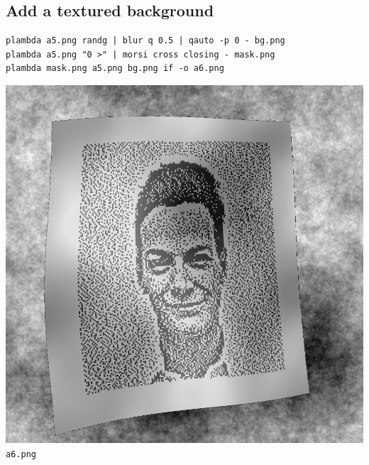 \clearpage
\subsection{Add a textured background}
\begin{verbatim}
plambda a5.png randg | blur q 0.5 | qauto -p 0 - bg.png
plambda a5.png "0 >" | morsi cross closing - mask.png
plambda mask.png a5.png bg.png if -o a6.png
\end{verbatim}
\includegraphics{a6.png}\verb+a6.png+

\clearpage
